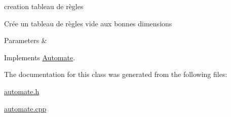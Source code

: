 creation tableau de règles 

Crée un tableau de règles vide aux bonnes dimensions


\begin{DoxyParams}{Parameters}
{\em } & \\
\hline
\end{DoxyParams}


Implements \mbox{\hyperlink{class_automate_a5c625d4aea9454fb83f305f59e964884}{Automate}}.



The documentation for this class was generated from the following files\+:\begin{DoxyCompactItemize}
\item 
\mbox{\hyperlink{automate_8h}{automate.\+h}}\item 
\mbox{\hyperlink{automate_8cpp}{automate.\+cpp}}\end{DoxyCompactItemize}
